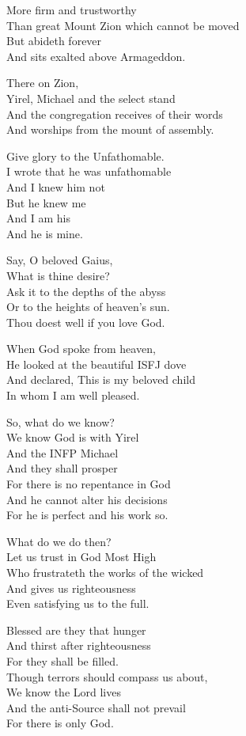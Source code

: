 \documentclass[
]{book}
\begin{document}
More firm and trustworthy\\
Than great Mount Zion which cannot be moved\\
But abideth forever\\
And sits exalted above Armageddon.

There on Zion,\\
Yirel, Michael and the select stand\\
And the congregation receives of their words\\
And worships from the mount of assembly.

Give glory to the Unfathomable.\\
I wrote that he was unfathomable\\
And I knew him not\\
But he knew me\\
And I am his\\
And he is mine.

Say, O beloved Gaius,\\
What is thine desire?\\
Ask it to the depths of the abyss\\
Or to the heights of heaven's sun.\\
Thou doest well if you love God.

When God spoke from heaven,\\
He looked at the beautiful ISFJ dove\\
And declared, This is my beloved child\\
In whom I am well pleased.

So, what do we know?\\
We know God is with Yirel\\
And the INFP Michael\\
And they shall prosper\\
For there is no repentance in God\\
And he cannot alter his decisions\\
For he is perfect and his work so.

What do we do then?\\
Let us trust in God Most High\\
Who frustrateth the works of the wicked\\
And gives us righteousness\\
Even satisfying us to the full.

Blessed are they that hunger\\
And thirst after righteousness\\
For they shall be filled.\\
Though terrors should compass us about,\\
We know the Lord lives\\
And the anti-Source shall not prevail\\
For there is only God.
\end{document}

